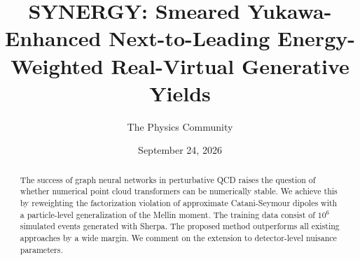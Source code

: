 \documentclass[11pt]{article}
\title{SYNERGY: Smeared Yukawa-Enhanced Next-to-Leading Energy-Weighted Real-Virtual Generative Yields}
\author{The Physics Community}
\date{September 24, 2026}
\numberwithin{equation}{section}
\theoremstyle{definition}
\theoremstyle{remark}
\begin{document}
\maketitle
\begin{abstract}
The success of graph neural networks in perturbative QCD raises the
question of whether numerical point cloud transformers can be
numerically stable. We achieve this by reweighting the factorization
violation of approximate Catani-Seymour dipoles with a particle-level
generalization of the Mellin moment. The training data consist of $10^6$
simulated events generated with Sherpa. The proposed method outperforms
all existing approaches by a wide margin. We comment on the extension to
detector-level nuisance parameters.
\end{abstract}
\tableofcontents



\nocite{*}


\end{document}
